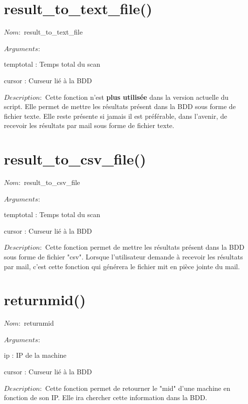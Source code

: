 \documentclass[12pt]{report}
\begin{document}
		\section{result\_to\_text\_file()}
			{\setlength{\parindent}{0cm}
			$Nom :$ result\_to\_text\_file\\\\
			}
			$Arguments :$
			\begin{description}
				\item temptotal : Temps total du scan
				\item cursor : Curseur lié à la BDD\\
			\end{description}
			$Description : $ Cette fonction n'est \textbf{plus utilisée} dans la version actuelle du script. Elle permet de mettre les résultats présent dans la BDD sous forme de fichier texte. Elle reste présente si jamais il est préférable, dans l'avenir, de recevoir les résultats par mail sous forme de fichier texte.
		\section{result\_to\_csv\_file()}
			{\setlength{\parindent}{0cm}
			$Nom :$ result\_to\_csv\_file\\\\
			}
			$Arguments :$
			\begin{description}
				\item temptotal : Temps total du scan
				\item cursor : Curseur lié à la BDD\\
			\end{description}
			$Description : $ Cette fonction permet de mettre les résultats présent dans la BDD sous forme de fichier "csv". Lorsque l'utilisateur demande à recevoir les résultats par mail, c'est cette fonction qui générera le fichier mit en pièce jointe du mail.
		\section{returnmid()}
			{\setlength{\parindent}{0cm}
			$Nom :$ returnmid\\\\
			}
			$Arguments :$
			\begin{description}
				\item ip : IP de la machine
				\item cursor : Curseur lié à la BDD\\
			\end{description}
			$Description : $ Cette fonction permet de retourner le "mid" d'une machine en fonction de son IP. Elle ira chercher cette information dans la BDD.
\end{document}
